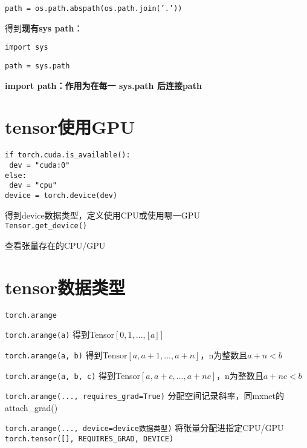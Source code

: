 \documentclass[UTF8]{ctexart}
\begin{document}
  \quad \texttt{path = os.path.abspath(os.path.join('.'))}

  得到\textbf{现有sys path}：

  \quad \texttt{import sys}

  \quad \texttt{path = sys.path}

  \textbf{import path：作用为在每一 sys.path 后连接path}


\section{tensor使用GPU}
\noindent \texttt{}
\texttt{if torch.cuda.is\_available():}\\
\texttt{  dev = "cuda:0"}\\
\texttt{else:}\\
\texttt{  dev = "cpu"}\\
\texttt{device = torch.device(dev)}

  得到device数据类型，定义使用CPU或使用哪一GPU\\
\texttt{Tensor.get\_device()}

  查看张量存在的CPU/GPU



\section{tensor数据类型}
\noindent \texttt{torch.arange}

  \texttt{torch.arange(a)} 得到Tensor$[0, 1, ..., \lfloor a \rfloor]$

  \texttt{torch.arange(a, b)} 得到Tensor$[a, a+1, ..., a+n]$，n为整数且$a+n < b$

  \texttt{torch.arange(a, b, c)} 得到Tensor$[a, a+c, ..., a+nc]$，n为整数且$a+nc < b$
  
  \texttt{torch.arange(..., requires\_grad=True)} 分配空间记录斜率，同mxnet的attach\_grad()
  
  \texttt{torch.arange(..., device=device数据类型)} 将张量分配进指定CPU/GPU\\
\texttt{torch.tensor([], REQUIRES\_GRAD, DEVICE)}
  
\end{document}
